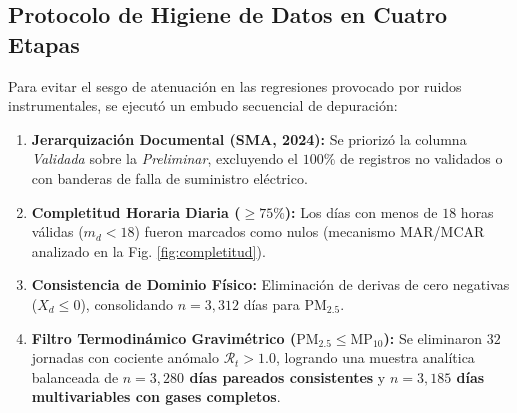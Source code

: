 \documentclass[10pt,twocolumn,a4paper]{article}
\begin{document}
\begin{table}[h]
\centering
\caption{Inventario de datasets oficiales del SINCA (Kingston College).}
\label{tab:datasets}
\vspace{-0.2cm}
\end{table}

\subsection{Protocolo de Higiene de Datos en Cuatro Etapas}
Para evitar el sesgo de atenuación en las regresiones provocado por ruidos instrumentales, se ejecutó un embudo secuencial de depuración:
\begin{enumerate}
    \item \textbf{Jerarquización Documental (SMA, 2024):} Se priorizó la columna \textit{Validada} sobre la \textit{Preliminar}, excluyendo el $100\%$ de registros no validados o con banderas de falla de suministro eléctrico.
    \item \textbf{Completitud Horaria Diaria ($\ge 75\%$):} Los días con menos de $18$ horas válidas ($m_d < 18$) fueron marcados como nulos (mecanismo MAR/MCAR analizado en la Fig. \ref{fig:completitud}).
    \item \textbf{Consistencia de Dominio Físico:} Eliminación de derivas de cero negativas ($X_d \le 0$), consolidando $n = 3,312$ días para $\text{PM}_{2.5}$.
    \item \textbf{Filtro Termodinámico Gravimétrico ($\text{PM}_{2.5} \le \text{MP}_{10}$):} Se eliminaron $32$ jornadas con cociente anómalo $\mathcal{R}_t > 1.0$, logrando una muestra analítica balanceada de \textbf{$n = 3,280$ días pareados consistentes} y \textbf{$n = 3,185$ días multivariables con gases completos}.
\end{enumerate}
\end{document}
